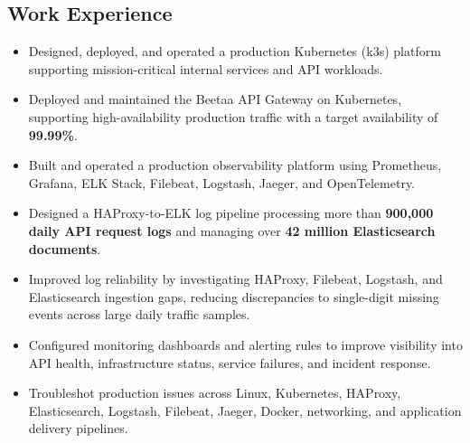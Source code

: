 \documentclass[../main.tex]{subfiles}
\begin{document}
\begin{category}
\section{Work Experience}


    \begin{itemize}
        \item Designed, deployed, and operated a production Kubernetes (k3s) platform supporting mission-critical internal services and API workloads.
        \item Deployed and maintained the Beetaa API Gateway on Kubernetes, supporting high-availability production traffic with a target availability of \textbf{99.99\%}.
        \item Built and operated a production observability platform using Prometheus, Grafana, ELK Stack, Filebeat, Logstash, Jaeger, and OpenTelemetry.
        \item Designed a HAProxy-to-ELK log pipeline processing more than \textbf{900,000 daily API request logs} and managing over \textbf{42 million Elasticsearch documents}.
        \item Improved log reliability by investigating HAProxy, Filebeat, Logstash, and Elasticsearch ingestion gaps, reducing discrepancies to single-digit missing events across large daily traffic samples.
        \item Configured monitoring dashboards and alerting rules to improve visibility into API health, infrastructure status, service failures, and incident response.
        \item Troubleshot production issues across Linux, Kubernetes, HAProxy, Elasticsearch, Logstash, Filebeat, Jaeger, Docker, networking, and application delivery pipelines.
    \end{itemize}
    

\end{category}
\end{document}
